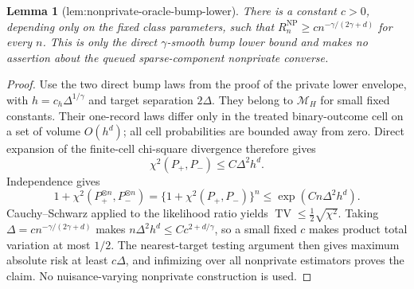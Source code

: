 \documentclass{article}
\newtheorem{lemma}{Lemma}
\begin{document}
\begin{lemma}[lem:nonprivate-oracle-bump-lower]\label{lem:nonprivate-oracle-bump-lower}
There is a constant \(c>0\), depending only on the fixed class parameters, such that \(R_n^{\mathrm{NP}}\ge c n^{-\gamma/(2\gamma+d)}\) for every \(n\).  This is only the direct \(\gamma\)-smooth bump lower bound and makes no assertion about the queued sparse-component nonprivate converse.
\end{lemma}
\begin{proof}
Use the two direct bump laws from the proof of the private lower envelope, with \(h=c_h\Delta^{1/\gamma}\) and target separation \(2\Delta\).  They belong to \(\mathcal M_H\) for small fixed constants.  Their one-record laws differ only in the treated binary-outcome cell on a set of volume \(O(h^d)\); all cell probabilities are bounded away from zero.  Direct expansion of the finite-cell chi-square divergence therefore gives
\[
 \chi^2(P_+,P_-)\le C\Delta^2h^d.
\]
Independence gives
\[
 1+\chi^2(P_+^{\otimes n},P_-^{\otimes n})
 =\{1+\chi^2(P_+,P_-)\}^n
 \le\exp(Cn\Delta^2h^d).
\]
Cauchy--Schwarz applied to the likelihood ratio yields \(\operatorname{TV}\le\tfrac12\sqrt{\chi^2}\).  Taking \(\Delta=c n^{-\gamma/(2\gamma+d)}\) makes \(n\Delta^2h^d\le Cc^{2+d/\gamma}\), so a small fixed \(c\) makes product total variation at most \(1/2\).  The nearest-target testing argument then gives maximum absolute risk at least \(c\Delta\), and infimizing over all nonprivate estimators proves the claim.  No nuisance-varying nonprivate construction is used.
\end{proof}
\end{document}
